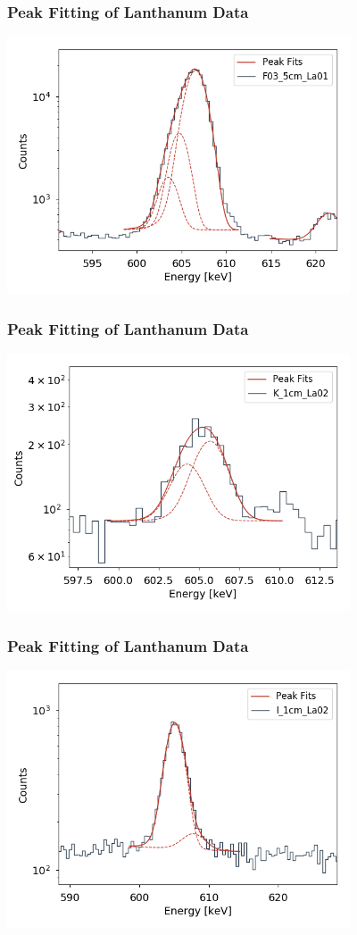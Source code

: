 \documentclass[12pt,xcolor=dvipsnames]{beamer}
\begin{document}
\begin{frame}
\frametitle{Peak Fitting of Lanthanum Data}
\includegraphics[width=4.0in]{early_604.png}
\end{frame}

\begin{frame}
\frametitle{Peak Fitting of Lanthanum Data}
\includegraphics[width=4.0in]{intermediate_604.png}
\end{frame}

\begin{frame}
\frametitle{Peak Fitting of Lanthanum Data}
\includegraphics[width=4.0in]{late_604.png}
\end{frame}
\end{document}
